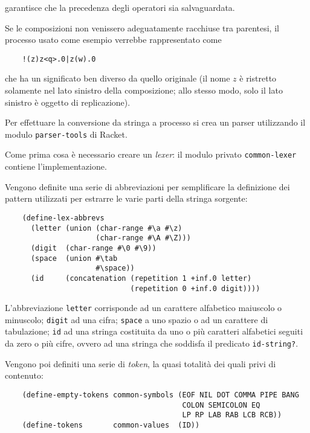 garantisce che la precedenza degli operatori sia salvaguardata.

Se le composizioni non venissero adeguatamente racchiuse tra parentesi,
il processo usato come esempio verrebbe rappresentato come

\begin{lstlisting}
    !(z)z<q>.0|z(w).0
\end{lstlisting}

che ha un significato ben diverso da quello originale (il nome $z$ \`e
ristretto solamente nel lato sinistro della composizione; allo stesso
modo, solo il lato sinistro \`e oggetto di replicazione).

Per effettuare la conversione da stringa a processo si crea un parser
utilizzando il modulo \lstinline{parser-tools} di Racket.

Come prima cosa \`e necessario creare un \emph{lexer}: il modulo
privato \lstinline{common-lexer} contiene l'implementazione.

Vengono definite una serie di abbreviazioni per semplificare la
definizione dei pattern utilizzati per estrarre le varie parti della
stringa sorgente:

\begin{lstlisting}
    (define-lex-abbrevs
      (letter (union (char-range #\a #\z)
                     (char-range #\A #\Z)))
      (digit  (char-range #\0 #\9))
      (space  (union #\tab
                     #\space))
      (id     (concatenation (repetition 1 +inf.0 letter)
                             (repetition 0 +inf.0 digit))))
\end{lstlisting}

L'abbreviazione \lstinline{letter} corrisponde ad un carattere alfabetico
maiuscolo o minuscolo; \lstinline{digit} ad una cifra; \lstinline{space}
a uno spazio o ad un carattere di tabulazione; \lstinline{id} ad una
stringa costituita da uno o pi\`u caratteri alfabetici seguiti da zero o
pi\`u cifre, ovvero ad una stringa che soddisfa il predicato
\lstinline{id-string?}.

Vengono poi definiti una serie di \emph{token}, la quasi totalit\`a dei
quali privi di contenuto:

\begin{lstlisting}
    (define-empty-tokens common-symbols (EOF NIL DOT COMMA PIPE BANG
                                         COLON SEMICOLON EQ
                                         LP RP LAB RAB LCB RCB))
    (define-tokens       common-values  (ID))
\end{lstlisting}

